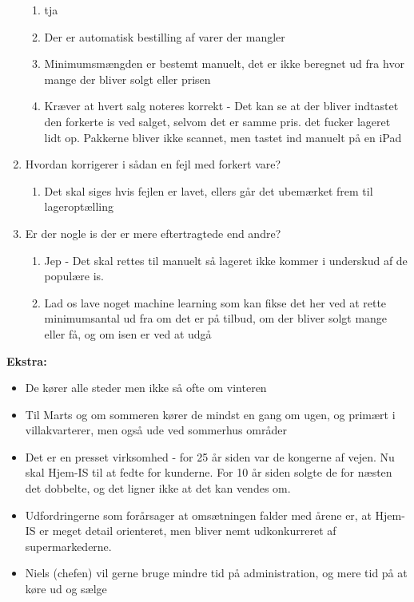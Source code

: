 \begin{enumerate}
\begin{enumerate}
        \item tja
        \item Der er automatisk bestilling af varer der mangler
        \item Minimumsmængden er bestemt manuelt, det er ikke beregnet ud fra hvor mange der bliver solgt eller prisen
        \item Kræver at hvert salg noteres korrekt - Det kan se at der bliver indtastet den forkerte is ved salget, selvom det er samme pris. det fucker lageret lidt op. Pakkerne bliver ikke scannet, men tastet ind manuelt på en iPad
    \end{enumerate}
    \item Hvordan korrigerer i sådan en fejl med forkert vare?
    \begin{enumerate}
        \item Det skal siges hvis fejlen er lavet, ellers går det ubemærket frem til lageroptælling
    \end{enumerate}
    \item Er der nogle is der er mere eftertragtede end andre?
    \begin{enumerate}
        \item Jep - Det skal rettes til manuelt så lageret ikke kommer i underskud af de populære is.
        \item Lad os lave noget machine learning som kan fikse det her ved at rette minimumsantal ud fra om det er på tilbud, om der bliver solgt mange eller få, og om isen er ved at udgå
    \end{enumerate}
\end{enumerate}

\textbf{Ekstra:}
\begin{itemize}
    \item De kører alle steder men ikke så ofte om vinteren
    \item Til Marts og om sommeren kører de mindst en gang om ugen, og primært i villakvarterer, men også ude ved sommerhus områder
    \item Det er en presset virksomhed - for 25 år siden var de kongerne af vejen. Nu skal Hjem-IS til at fedte for kunderne. For 10 år siden solgte de for næsten det dobbelte, og det ligner ikke at det kan vendes om.
    \item Udfordringerne som forårsager at omsætningen falder med årene er, at Hjem-IS er meget detail orienteret, men bliver nemt udkonkurreret af supermarkederne.
    \item Niels (chefen) vil gerne bruge mindre tid på administration, og mere tid på at køre ud og sælge
\end{itemize}
